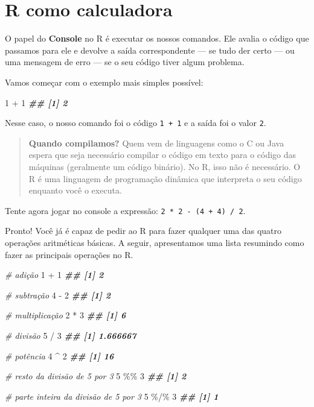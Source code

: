 \documentclass[
]{book}
\newenvironment{Shaded}{\begin{snugshade}}{\end{snugshade}}
\newcommand{\CommentTok}[1]{\textcolor[rgb]{0.56,0.35,0.01}{\textit{#1}}}
\newcommand{\DecValTok}[1]{\textcolor[rgb]{0.00,0.00,0.81}{#1}}
\newcommand{\DocumentationTok}[1]{\textcolor[rgb]{0.56,0.35,0.01}{\textbf{\textit{#1}}}}
\newcommand{\SpecialCharTok}[1]{\textcolor[rgb]{0.00,0.00,0.00}{#1}}
\begin{document}
\hypertarget{r-como-calculadora}{%
\section{R como calculadora}\label{r-como-calculadora}}

O papel do \textbf{Console} no R é executar os nossos comandos. Ele avalia o código que passamos para ele e devolve a saída correspondente --- se tudo der certo --- ou uma mensagem de erro --- se o seu código tiver algum problema.

Vamos começar com o exemplo mais simples possível:

\begin{Shaded}
\begin{Highlighting}[]
\DecValTok{1} \SpecialCharTok{+} \DecValTok{1}
\DocumentationTok{\#\# [1] 2}
\end{Highlighting}
\end{Shaded}

Nesse caso, o nosso comando foi o código \texttt{1\ +\ 1} e a saída foi o valor \texttt{2}.

\begin{quote}
\textbf{Quando compilamos?} Quem vem de linguagens como o C ou Java espera que seja necessário compilar o código em texto para o código das máquinas (geralmente um código binário). No R, isso não é necessário. O R é uma linguagem de programação dinâmica que interpreta o seu código enquanto você o executa.
\end{quote}

Tente agora jogar no console a expressão: \texttt{2\ *\ 2\ -\ (4\ +\ 4)\ /\ 2}.

Pronto! Você já é capaz de pedir ao R para fazer qualquer uma das quatro operações aritméticas básicas. A seguir, apresentamos uma lista resumindo como fazer as principais operações no R.

\begin{Shaded}
\begin{Highlighting}[]
\CommentTok{\# adição}
\DecValTok{1} \SpecialCharTok{+} \DecValTok{1}
\DocumentationTok{\#\# [1] 2}

\CommentTok{\# subtração}
\DecValTok{4} \SpecialCharTok{{-}} \DecValTok{2}
\DocumentationTok{\#\# [1] 2}

\CommentTok{\# multiplicação}
\DecValTok{2} \SpecialCharTok{*} \DecValTok{3}
\DocumentationTok{\#\# [1] 6}

\CommentTok{\# divisão}
\DecValTok{5} \SpecialCharTok{/} \DecValTok{3}
\DocumentationTok{\#\# [1] 1.666667}

\CommentTok{\# potência}
\DecValTok{4} \SpecialCharTok{\^{}} \DecValTok{2}
\DocumentationTok{\#\# [1] 16}

\CommentTok{\# resto da divisão de 5 por 3}
\DecValTok{5} \SpecialCharTok{\%\%} \DecValTok{3}
\DocumentationTok{\#\# [1] 2}

\CommentTok{\# parte inteira da divisão de 5 por 3}
\DecValTok{5} \SpecialCharTok{\%/\%} \DecValTok{3}  
\DocumentationTok{\#\# [1] 1}
\end{Highlighting}
\end{Shaded}
\end{document}
